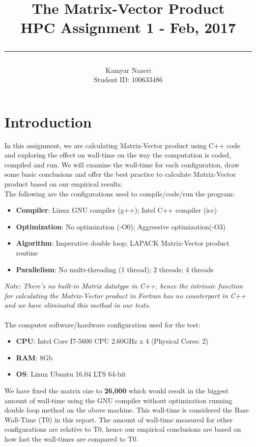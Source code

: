 \documentclass[a4paper,11pt]{article}
\begin{document}
\title{
	\Huge \textbf {The Matrix-Vector Product}
    \\ [0.2cm]
	\LARGE HPC Assignment 1 - Feb, 2017
    \\ [0.5cm]
    \hrule
}

\date{}

\author{
		\Large Kamyar Nazeri \\
		\large Student ID: 100633486 }

\maketitle
\newpage

\section*{Introduction}
In this assignment, we are calculating Matrix-Vector product using C++ code and exploring the effect on wall-time on the way the computation is coded, compiled and run. We will examine the wall-time for each configuration, draw some basic conclusions and offer the best practice to calculate Matrix-Vector product based on our empirical results. \\
The following are the configurations used to compile/code/run the program:
\begin{itemize}
  \item \textbf{Compiler}: Linux GNU compiler (g++); Intel C++ compiler (icc)
  \item \textbf{Optimization}: No optimization (-O0); Aggressive optimization(-O3)
  \item \textbf{Algorithm}: Imperative double loop; LAPACK Matrix-Vector product routine
  \item \textbf{Parallelism}: No multi-threading (1 thread); 2 threads; 4 threads
\end{itemize}
\textit{Note: There’s no built-in Matrix datatype in C++, hence the intrinsic function for calculating the Matrix-Vector product in Fortran has no counterpart in C++ and we have eliminated this method in our tests.} \\\\
The computer software/hardware configuration used for the test:
\begin{itemize}
    \setlength\itemsep{0em}
    \item \textbf{CPU}: Intel Core I7-5600 CPU 2.60GHz x 4 (Physical Cores: 2)
    \item \textbf{RAM}: 8Gb
    \item \textbf{OS}: Linux Ubuntu 16.04 LTS 64-bit
\end{itemize}
\par\noindent
We have fixed the matrix size to \textbf{26,000} which would result in the biggest amount of wall-time using the GNU compiler without optimization running double loop method on the above machine. This wall-time is considered the Base Wall-Time (T0) in this report. The amount of wall-time measured for other configurations are relative to T0, hence our empirical conclusions are based on how fast the wall-times are compared to T0.
\end{document}
